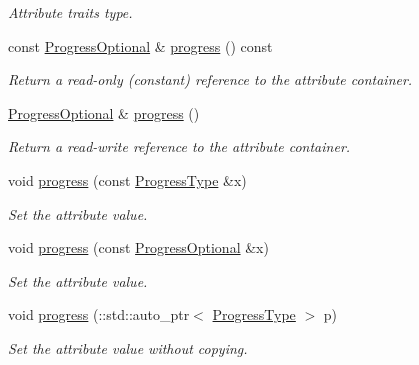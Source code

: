 \begin{DoxyCompactItemize}
\begin{DoxyCompactList}\small\item\em Attribute traits type. \item\end{DoxyCompactList}\item 
const \hyperlink{classopenstack_1_1xml_1_1Image_a2eccdcee5ec73e85036a773756a4df0b}{ProgressOptional} \& \hyperlink{classopenstack_1_1xml_1_1Image_a8bba33e8e266cd747619db3b00e1120b}{progress} () const 
\begin{DoxyCompactList}\small\item\em Return a read-\/only (constant) reference to the attribute container. \item\end{DoxyCompactList}\item 
\hyperlink{classopenstack_1_1xml_1_1Image_a2eccdcee5ec73e85036a773756a4df0b}{ProgressOptional} \& \hyperlink{classopenstack_1_1xml_1_1Image_a65b2f38514f9c187e0eafd3afb499ce4}{progress} ()
\begin{DoxyCompactList}\small\item\em Return a read-\/write reference to the attribute container. \item\end{DoxyCompactList}\item 
void \hyperlink{classopenstack_1_1xml_1_1Image_ab8e544fe4ee546e111edf967738e9532}{progress} (const \hyperlink{classopenstack_1_1xml_1_1Progress}{ProgressType} \&x)
\begin{DoxyCompactList}\small\item\em Set the attribute value. \item\end{DoxyCompactList}\item 
void \hyperlink{classopenstack_1_1xml_1_1Image_a88a68b827f8963356a28efae2a9b8cb2}{progress} (const \hyperlink{classopenstack_1_1xml_1_1Image_a2eccdcee5ec73e85036a773756a4df0b}{ProgressOptional} \&x)
\begin{DoxyCompactList}\small\item\em Set the attribute value. \item\end{DoxyCompactList}\item 
void \hyperlink{classopenstack_1_1xml_1_1Image_a13fb5c55344f194a440677c5c27f13c5}{progress} (::std::auto\_\-ptr$<$ \hyperlink{classopenstack_1_1xml_1_1Progress}{ProgressType} $>$ p)
\begin{DoxyCompactList}\small\item\em Set the attribute value without copying. \item\end{DoxyCompactList}\end{DoxyCompactItemize}
